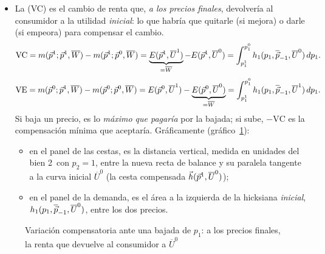 \documentclass[11pt]{article}
\begin{document}
\begin{itemize}
\item La  (VC) es el cambio de renta que, \emph{a los precios finales}, devolvería al consumidor a la utilidad \emph{inicial}: lo que habría que quitarle (si mejora) o darle (si empeora) para compensar el cambio.
  \begin{equation}
  \mathrm{VC}=m(\vec{p}^1;\vec{p}^1,\overline{W})-m(\vec{p}^1;\vec{p}^0,\overline{W})=\underbrace{E(\vec{p}^1,\overline{U}^1)}_{=\overline{W}}-E(\vec{p}^1,\overline{U}^0)=\int_{p_1^1}^{p_1^0}h_1(p_1,\overline{\vec{p}}_{-1},\overline{U}^0)\,dp_1. \label{eq:vc}
  \end{equation}
  \begin{equation}
  \mathrm{VE}=m(\vec{p}^0;\vec{p}^1,\overline{W})-m(\vec{p}^0;\vec{p}^0,\overline{W})=E(\vec{p}^0,\overline{U}^1)-\underbrace{E(\vec{p}^0,\overline{U}^0)}_{=\overline{W}}=\int_{p_1^1}^{p_1^0}h_1(p_1,\overline{\vec{p}}_{-1},\overline{U}^1)\,dp_1. \label{eq:ve}
  \end{equation}
  Si baja un precio, es lo \emph{máximo que pagaría} por la bajada; si sube, $-\mathrm{VC}$ es la compensación mínima que aceptaría.
  Gráficamente (gráfico~\ref{fig:bienestar-vc}):
  \begin{itemize}
  \item en el panel de las cestas, es la distancia vertical, medida en unidades del bien 2~con $p_2=1$, entre la nueva recta de balance y su paralela tangente a la curva inicial $\overline{U}^0$ (la cesta compensada $\vec{h}(\vec{p}^1,\overline{U}^0)$);
  \item en el panel de la demanda, es el área a la izquierda de la hicksiana \emph{inicial}, $h_1(p_1,\overline{\vec{p}}_{-1},\overline{U}^0)$, entre los dos precios.
  \end{itemize}
\end{itemize}

\begin{figure}[H]
\centering
\caption{Variación compensatoria ante una bajada de $p_1$: a los precios finales, la renta que devuelve al consumidor a $\overline{U}^0$}\label{fig:bienestar-vc}
\end{figure}
\end{document}
